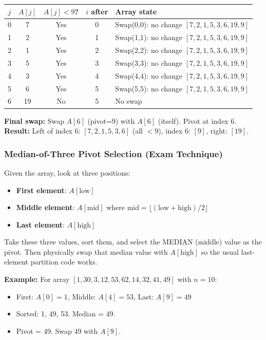 \documentclass[12pt,portrait]{article}
\begin{document}
\begin{center}
\begin{tabular}{c|c|c|c|l}
\toprule
$j$ & $A[j]$ & $A[j] < 9$? & $i$ after & Array state \\
\midrule
0 & 7 & Yes & 0 & Swap(0,0): no change $[7,2,1,5,3,6,19,9]$ \\
1 & 2 & Yes & 1 & Swap(1,1): no change $[7,2,1,5,3,6,19,9]$ \\
2 & 1 & Yes & 2 & Swap(2,2): no change $[7,2,1,5,3,6,19,9]$ \\
3 & 5 & Yes & 3 & Swap(3,3): no change $[7,2,1,5,3,6,19,9]$ \\
4 & 3 & Yes & 4 & Swap(4,4): no change $[7,2,1,5,3,6,19,9]$ \\
5 & 6 & Yes & 5 & Swap(5,5): no change $[7,2,1,5,3,6,19,9]$ \\
6 & 19 & No & 5 & No swap \\
\bottomrule
\end{tabular}

\textbf{Final swap:} Swap $A[6]$ (pivot=9) with $A[6]$ (itself). Pivot at index 6. \\
\textbf{Result:} Left of index 6: $[7,2,1,5,3,6]$ (all $<9$), index 6: $[9]$, right: $[19]$.
\end{center}

\subsubsection{Median-of-Three Pivot Selection (Exam Technique)}

\begin{rulebox}
Given the array, look at three positions:
\begin{itemize}[leftmargin=*]
    \item \textbf{First element}: $A[\text{low}]$
    \item \textbf{Middle element}: $A[\text{mid}]$ where $\text{mid} = \lfloor(\text{low}+\text{high})/2\rfloor$
    \item \textbf{Last element}: $A[\text{high}]$
\end{itemize}
Take these three values, sort them, and select the MEDIAN (middle) value as the pivot. Then physically swap that median value with $A[\text{high}]$ so the usual last-element partition code works.

\textbf{Example:} For array $[1,30,3,12,53,62,14,32,41,49]$ with $n=10$:
\begin{itemize}[leftmargin=*]
    \item First: $A[0]=1$, Middle: $A[4]=53$, Last: $A[9]=49$
    \item Sorted: 1, 49, 53. Median = 49.
    \item Pivot = 49. Swap 49 with $A[9]$.
\end{itemize}
\end{rulebox}
\end{document}
